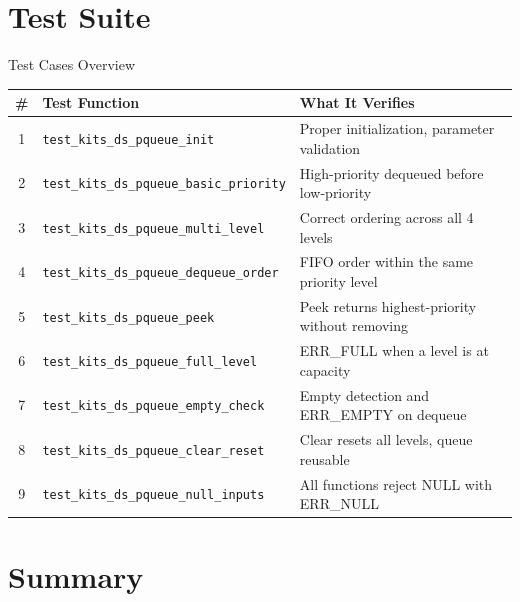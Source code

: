 \documentclass[aspectratio=169, 10pt]{beamer}
\begin{document}
\section{Test Suite}

\begin{frame}{Test Cases Overview}
\begin{table}
\centering
\small
\begin{tabular}{@{}clp{7cm}@{}}
\toprule
\textbf{\#} & \textbf{Test Function} & \textbf{What It Verifies} \\
\midrule
1 & \texttt{test\_kits\_ds\_pqueue\_init}
  & Proper initialization, parameter validation \\
2 & \texttt{test\_kits\_ds\_pqueue\_basic\_priority}
  & High-priority dequeued before low-priority \\
3 & \texttt{test\_kits\_ds\_pqueue\_multi\_level}
  & Correct ordering across all 4 levels \\
4 & \texttt{test\_kits\_ds\_pqueue\_dequeue\_order}
  & FIFO order within the same priority level \\
5 & \texttt{test\_kits\_ds\_pqueue\_peek}
  & Peek returns highest-priority without removing \\
6 & \texttt{test\_kits\_ds\_pqueue\_full\_level}
  & ERR\_FULL when a level is at capacity \\
7 & \texttt{test\_kits\_ds\_pqueue\_empty\_check}
  & Empty detection and ERR\_EMPTY on dequeue \\
8 & \texttt{test\_kits\_ds\_pqueue\_clear\_reset}
  & Clear resets all levels, queue reusable \\
9 & \texttt{test\_kits\_ds\_pqueue\_null\_inputs}
  & All functions reject NULL with ERR\_NULL \\
\bottomrule
\end{tabular}
\end{table}
\end{frame}

\section{Summary}
\end{document}
